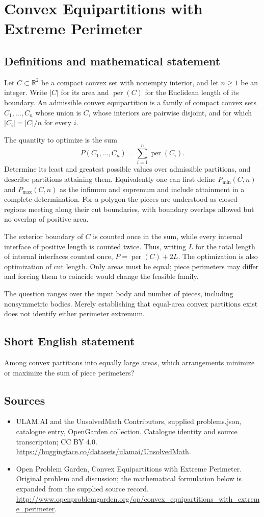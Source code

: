 \documentclass[11pt,a4paper]{article}
\begin{document}
\section*{Convex Equipartitions with Extreme Perimeter}\label{statement}

\subsection{Definitions and mathematical statement}
Let $C\subset\mathbb R^2$ be a compact convex set with nonempty interior,
and let $n\ge1$ be an integer. Write $|C|$ for its area and
$\operatorname{per}(C)$ for the Euclidean length of its boundary.
An admissible convex equipartition is a family of compact convex sets
$C_1,\ldots,C_n$ whose union is $C$, whose interiors are pairwise disjoint,
and for which $|C_i|=|C|/n$ for every $i$.

The quantity to optimize is the sum
\[
 P(C_1,\ldots,C_n)=\sum_{i=1}^n\operatorname{per}(C_i).
\]
Determine its least and greatest possible values over admissible partitions,
and describe partitions attaining them. Equivalently one can first define
$P_{\min}(C,n)$ and $P_{\max}(C,n)$ as the infimum and supremum and
include attainment in a complete determination. For a polygon the pieces
are understood as closed regions meeting along their cut boundaries,
with boundary overlaps allowed but no overlap of positive area.

The exterior boundary of $C$ is counted once in the sum, while every
internal interface of positive length is counted twice. Thus, writing
$L$ for the total length of internal interfaces counted once,
$P=\operatorname{per}(C)+2L$. The optimization is also optimization of
cut length. Only areas must be equal; piece perimeters may differ and
forcing them to coincide would change the feasible family.

The question ranges over the input body and number of pieces, including
nonsymmetric bodies. Merely establishing that equal-area convex partitions
exist does not identify either perimeter extremum.
\subsection{Short English statement}
Among convex partitions into equally large areas, which arrangements minimize or maximize the sum of piece perimeters?
\subsection{Sources}
\begin{itemize}
\item[S1] ULAM.AI and the UnsolvedMath Contributors, supplied problems.json, catalogue entry, OpenGarden collection. Catalogue identity and source transcription; CC BY 4.0.
\url{https://huggingface.co/datasets/ulamai/UnsolvedMath}.
\item[S2] Open Problem Garden, Convex Equipartitions with Extreme Perimeter. Original problem and discussion; the mathematical formulation below is expanded from the supplied source record.
\url{http://www.openproblemgarden.org/op/convex_equipartitions_with_extreme_perimeter}.
\end{itemize}
\end{document}
